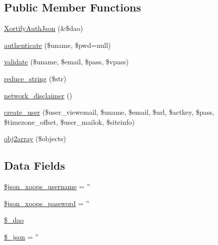 \subsection*{Public Member Functions}
\begin{DoxyCompactItemize}
\item 
\hyperlink{class_xortify_auth_json_af9cea820589b04eda07f0170290d81ae}{Xortify\-Auth\-Json} (\&\$dao)
\item 
\hyperlink{class_xortify_auth_json_a00678ba307326b734e6c679f28bea315}{authenticate} (\$uname, \$pwd=null)
\item 
\hyperlink{class_xortify_auth_json_a91121a1b702dfd20fb65a027c8ed26ec}{validate} (\$uname, \$email, \$pass, \$vpass)
\item 
\hyperlink{class_xortify_auth_json_ae463a3baa44e95fa5b5151ab2334df1c}{reduce\-\_\-string} (\$str)
\item 
\hyperlink{class_xortify_auth_json_a1874c27b6f81a3f2ff9015405ad0f8bc}{network\-\_\-disclaimer} ()
\item 
\hyperlink{class_xortify_auth_json_ac72efc5ad313a592cf6706876f56f7ec}{create\-\_\-user} (\$user\-\_\-viewemail, \$uname, \$email, \$url, \$actkey, \$pass, \$timezone\-\_\-offset, \$user\-\_\-mailok, \$siteinfo)
\item 
\hyperlink{class_xortify_auth_json_aabc52e4f78557f0e0b360a8aaba6e11d}{obj2array} (\$objects)
\end{DoxyCompactItemize}
\subsection*{Data Fields}
\begin{DoxyCompactItemize}
\item 
\hyperlink{class_xortify_auth_json_ac058687d82a56fb93513e7e58c4ec391}{\$json\-\_\-xoops\-\_\-username} = ''
\item 
\hyperlink{class_xortify_auth_json_a7af311f07c1c09254920e6ac0cefe9a9}{\$json\-\_\-xoops\-\_\-password} = ''
\item 
\hyperlink{class_xortify_auth_json_a12a029c610f699b4b25e79a1f64a3485}{\$\-\_\-dao}
\item 
\hyperlink{class_xortify_auth_json_a94787b37d92a2dee02534eed4f316589}{\$\-\_\-json} = ''
\end{DoxyCompactItemize}


